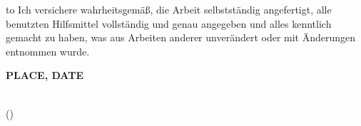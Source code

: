 
\thispagestyle{empty}
\null\vfill
\noindent\hbox to \textwidth{\hrulefill} 
%
{Ich versichere wahrheitsgemäß, die Arbeit
	selbstständig angefertigt, alle benutzten Hilfsmittel vollständig und genau
	angegeben und alles kenntlich gemacht zu haben, was aus Arbeiten anderer
	unverändert oder mit Änderungen entnommen wurde.}


\textbf{PLACE, DATE}
\vspace{1.5cm}

\dotfill\hspace*{8.0cm}\\
\hspace*{2cm}(\theauthor) 
\cleardoublepage
